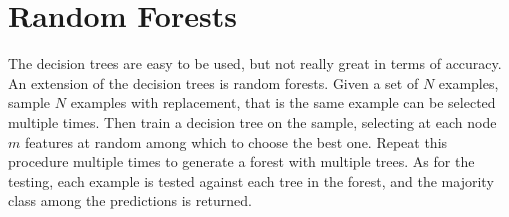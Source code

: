 \section{Random Forests}
The decision trees are easy to be used, but not really great in terms of accuracy. An extension of the decision trees is random forests. \newline
Given a set of $N$ examples, sample $N$ examples with replacement, that is the same example can be selected multiple times. Then train a decision tree on the sample, selecting at each node $m$ features at random among which to choose the best one. Repeat this procedure multiple times to generate a forest with multiple trees.\newline
As for the testing, each example is tested against each tree in the forest, and the majority class among the predictions is returned. 